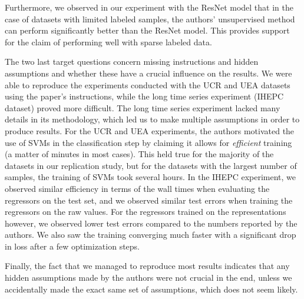 \documentclass{article}
\begin{document}
Furthermore, we observed in our experiment with the ResNet model that in the case of datasets with limited labeled samples, the authors' unsupervised method can perform significantly better than the ResNet model. This provides support for the claim of performing well with sparse labeled data.

The two last target questions concern missing instructions and hidden assumptions and whether these have a crucial influence on the results. 
 We were able to reproduce the experiments conducted with the UCR and UEA datasets using the paper's instructions, while the long time series experiment (IHEPC dataset) proved more difficult. The long time series experiment lacked many details in its methodology, which led us to make multiple assumptions in order to produce results. For the UCR and UEA experiments, the authors motivated the use of SVMs in the classification step by claiming it allows for \textit{efficient} training (a matter of minutes in most cases). This held true for the majority of the datasets in our replication study, but for the datasets with the largest number of samples, the training of SVMs took several hours. In the IHEPC experiment, we observed similar efficiency in terms of the wall times when evaluating the regressors on the test set, and we observed similar test errors when training the regressors on the raw values. For the regressors trained on the representations however, we observed lower test errors compared to the numbers reported by the authors. We also saw the training converging much faster with a significant drop in loss after a few optimization steps.
 

Finally, the fact that we managed to reproduce most results indicates that any hidden assumptions made by the authors were not crucial in the end, unless we accidentally made the exact same set of assumptions, which does not seem likely.
\end{document}
